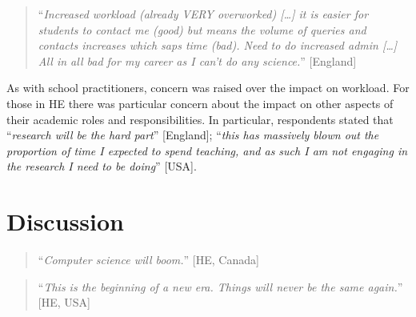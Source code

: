 \documentclass[sigconf]{acmart}
\begin{document}
\begin{quotation}
``{\emph{Increased workload (already VERY overworked) […]  it is
easier for students to contact me (good) but means the volume of
queries and contacts increases which saps time (bad). Need to do
increased admin […] All in all bad for my career as I can’t do any
science.}}'' [England]
\end{quotation}

As with school practitioners, concern was raised over the impact on
workload. For those in HE there was particular concern about the
impact on other aspects of their academic roles and
responsibilities. In particular, respondents stated that
``{\emph{research will be the hard part}}'' [England]; ``{\emph{this has
massively blown out the proportion of time I expected to spend
teaching, and as such I am not engaging in the research I need to be
doing}}'' [USA].

\section{Discussion}\label{discussion}

\begin{quotation}
``{\emph{Computer science will boom.}}'' [HE, Canada]
\end{quotation}

\begin{quotation}
``{\emph{This is the beginning of a new era. Things will never be the
same again.}}'' [HE, USA]
\end{quotation}


\end{document}

